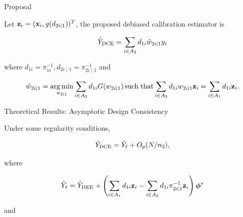\documentclass[final]{beamer}
\DeclareMathOperator*{\argmin}{arg\,min}
\DeclareMathOperator*{\suchthat}{such\; that}
\newlength{\colwidth}
\begin{document}
\begin{frame}[t]
\begin{columns}[t]
\begin{column}{\colwidth}
  \begin{alertblock}{Proposal}

    Let ${\bf{z}}_i = ({\bf x}_i, g(d_{2i|1}))^T$, the proposed debiased
    calibration estimator is 
    \vspace{-1.0cm}

    \begin{equation}
    \hat Y_{\rm{DCE}} = \sum_{i \in A_2} d_{1i} \hat w_{2i|1} y_i
    \end{equation}

    \vspace{-1.0cm}

    where $d_{1i} = \pi_{1i}^{-1}, d_{2i \mid 1}= \pi_{2i \mid 1}^{-1}$ and 
    \vspace{-0.5cm}

    \begin{equation}\label{eq:wmin}
    \hat w_{2i|1} = \argmin_{w_{2|1}} \sum_{i \in A_2} d_{1i} G(w_{2i|1})
    \suchthat \sum_{i \in A_2} d_{1i} w_{2i|1} {\bf{z}}_i = 
    \sum_{i \in A_1} d_{1i} {\bf{z}}_i.
    \end{equation}
    
    \vspace{-0.5cm}
  \end{alertblock}

  \begin{exampleblock}{Theoretical Results: Asymptotic Design Consistency}

    Under some regularity conditions, %
    \vspace{-0.7cm}

    $$\hat Y_{\rm{DCE}} = \hat Y_\ell + O_p(N / n_2), $$

    \vspace{-1.0cm}
    where 
    \vspace{-1.3cm}

    $$\hat Y_{\ell} = \hat Y_{\rm{DEE}}+ 
    \left(\sum_{i \in A_1} d_{1i} {\bf z}_i - \sum_{i \in A_2} d_{1i} 
    \pi_{2i \mid 1}^{-1}  {\bf z}_i \right)\bm \phi^*$$

    \vspace{-1.3cm}
    and
    \vspace{-0.7cm}


\end{exampleblock}
\end{column}
\end{columns}
\end{frame}
\end{document}
